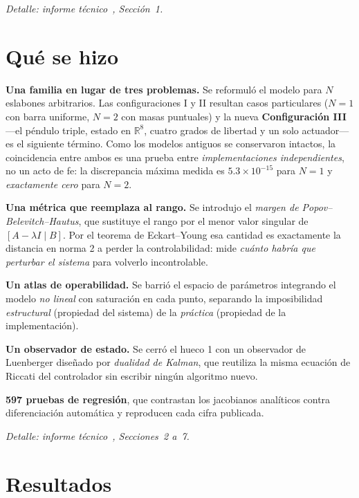 \documentclass[11pt,letterpaper]{article}
\newcommand{\R}{\mathbb{R}}
\begin{document}
\noindent\emph{Detalle: informe técnico~\cite{tecnico2}, Sección~1.}

\section{Qué se hizo}

\textbf{Una familia en lugar de tres problemas.} Se reformuló el modelo para $N$
eslabones arbitrarios. Las configuraciones I y II resultan casos particulares
($N=1$ con barra uniforme, $N=2$ con masas puntuales) y la nueva
\textbf{Configuración III} ---el péndulo triple, estado en $\R^8$, cuatro grados
de libertad y un solo actuador--- es el siguiente término. Como los modelos
antiguos se conservaron intactos, la coincidencia entre ambos es una prueba
entre \emph{implementaciones independientes}, no un acto de fe: la discrepancia
máxima medida es $5.3\times10^{-15}$ para $N=1$ y \emph{exactamente cero} para
$N=2$.

\textbf{Una métrica que reemplaza al rango.} Se introdujo el \emph{margen de
Popov--Belevitch--Hautus}, que sustituye el rango por el menor valor singular de
$[A-\lambda I\mid B]$. Por el teorema de Eckart--Young esa cantidad es
exactamente la distancia en norma 2 a perder la controlabilidad: mide
\emph{cuánto habría que perturbar el sistema} para volverlo incontrolable.

\textbf{Un atlas de operabilidad.} Se barrió el espacio de parámetros integrando
el modelo \emph{no lineal} con saturación en cada punto, separando la
imposibilidad \emph{estructural} (propiedad del sistema) de la \emph{práctica}
(propiedad de la implementación).

\textbf{Un observador de estado.} Se cerró el hueco 1 con un observador de
Luenberger diseñado por \emph{dualidad de Kalman}, que reutiliza la misma
ecuación de Riccati del controlador sin escribir ningún algoritmo nuevo.

\textbf{597 pruebas de regresión}, que contrastan los jacobianos analíticos
contra diferenciación automática y reproducen cada cifra publicada.

\noindent\emph{Detalle: informe técnico~\cite{tecnico2}, Secciones~2 a~7.}

\section{Resultados}
\end{document}
